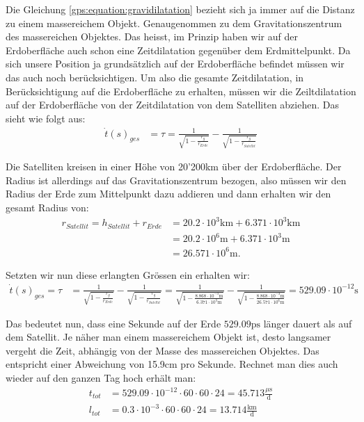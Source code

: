 \begin{refsection}
Die Gleichung \ref{gps:equation:gravidilatation} bezieht sich ja immer auf die Distanz zu einem massereichem Objekt. Genaugenommen zu dem Gravitationszentrum des massereichen Objektes. Das heisst, im Prinzip haben wir auf der Erdoberfläche auch schon eine Zeitdilatation gegenüber dem Erdmittelpunkt. Da sich unsere Position ja grundsätzlich auf der Erdoberfläche befindet müssen wir das auch noch berücksichtigen. Um also die gesamte Zeitdilatation, in Berücksichtigung auf die Erdoberfläche zu erhalten, müssen wir die Zeiltdilatation auf der Erdoberfläche von der Zeitdilatation von dem Satelliten abziehen. Das sieht wie folgt aus:
\begin{align*}
\dot t(s)_ {ges} &= \tau = \frac{1}{\sqrt{1-\frac{r_g}{r_{Erde}}}} - \frac{1}{\sqrt{1-\frac{r_g}{r_{Satellit}}}}
\end{align*}

Die Satelliten kreisen in einer Höhe von 20'200km über der Erdoberfläche. Der Radius ist allerdings auf das Gravitationszentrum bezogen, also müssen wir den Radius der Erde zum Mittelpunkt dazu addieren und dann erhalten wir den gesamt Radius von:
\begin{align*}
r_{Satellit}  = h_{Satellit} + r_{Erde} & = 20.2 \cdot 10^3\text{km} + 6.371 \cdot 10^3\text{km} 
\\
 & = 20.2 \cdot 10^6\text{m} + 6.371 \cdot 10^3\text{m} 
\\
 & = 26.571 \cdot 10^6\text{m}.
\end{align*}

\noindent{}Setzten wir nun diese erlangten Grössen ein erhalten wir:
\begin{align*}
\dot t(s)_ {ges} = \tau & = \frac{1}{\sqrt{1-\frac{r_g}{r_{Erde}}}} - \frac{1}{\sqrt{1-\frac{r_g}{r_{Satellit}}}} = \frac{1}{\sqrt{1-\frac{8.868 \cdot 10^{-3}\text{m}}{ 6.371 \cdot 10^3\text{m}}}} - \frac{1}{\sqrt{1-\frac{8.868 \cdot 10^{-3}\text{m}}{ 26.571 \cdot 10^6\text{m}}}} =  529.09 \cdot 10^{-12}\text{s}
\end{align*}

\noindent{}Das bedeutet nun, dass eine Sekunde auf der Erde \( 529.09\text{ps} \) länger dauert als auf dem Satellit. Je näher man einem massereichem Objekt ist, desto langsamer vergeht die Zeit, abhängig von der Masse des massereichen Objektes. Das entspricht einer Abweichung von 15.9cm pro Sekunde. Rechnet man dies auch wieder auf den ganzen Tag hoch erhält man:
\begin{align*}
t_{tot} & = 529.09 \cdot 10^{-12} \cdot 60 \cdot 60 \cdot 24 = 45.713\frac{\mu{}\text{s}}{\text{d}}
\\
l_{tot} &= 0.3 \cdot 10^{-3} \cdot 60 \cdot 60 \cdot 24 = 13.714\frac{\text{km}}{\text{d}}
\end{align*}


\end{refsection}
